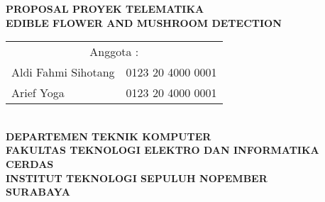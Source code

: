 \centering

\textbf{\LARGE PROPOSAL PROYEK TELEMATIKA}\\[0.5cm]
\textbf{\LARGE EDIBLE FLOWER AND MUSHROOM DETECTION}\\[1.5cm]




\vfill

\begin{tabular}{ll}
  \multicolumn{2}{c}{Anggota :} \\
    Aldi Fahmi Sihotang&\textmd{0123 20 4000 0001}\\
    Arief Yoga&\textmd{0123 20 4000 0001}        
\end{tabular} \\[2cm]

\textbf{DEPARTEMEN TEKNIK KOMPUTER}\\
\textbf{FAKULTAS TEKNOLOGI ELEKTRO DAN INFORMATIKA CERDAS}\\
\textbf{INSTITUT TEKNOLOGI SEPULUH NOPEMBER}\\
\textbf{SURABAYA}
